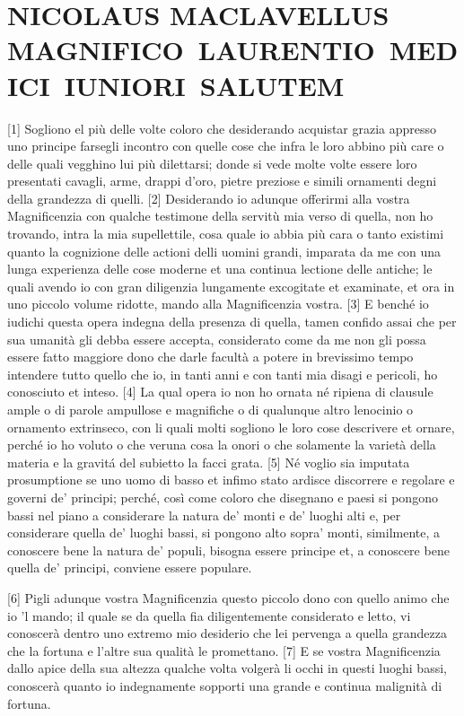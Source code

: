 
\section*{NICOLAUS MACLAVELLUS MAGNIFICO~LAURENTIO~MEDICI~IUNIORI~SALUTEM}

{[}1{]} Sogliono el più delle volte coloro che desiderando acquistar
grazia appresso uno principe farsegli incontro con quelle cose che infra
le loro abbino più care o delle quali vegghino lui più dilettarsi; donde
si vede molte volte essere loro presentati cavagli, arme, drappi d'oro,
pietre preziose e simili ornamenti degni della grandezza di quelli.
{[}2{]} Desiderando io adunque offerirmi alla vostra Magnificenzia con
qualche testimone della servitù mia verso di quella, non ho trovando,
intra la mia supellettile, cosa quale io abbia più cara o tanto existimi
quanto la cognizione delle actioni delli uomini grandi, imparata da me
con una lunga experienza delle cose moderne et una continua lectione
delle antiche; le quali avendo io con gran diligenzia lungamente
excogitate et examinate, et ora in uno piccolo volume ridotte, mando
alla Magnificenzia vostra. {[}3{]} E benché io iudichi questa opera
indegna della presenza di quella, tamen confido assai che per sua
umanità gli debba essere accepta, considerato come da me non gli possa
essere fatto maggiore dono che darle facultà a potere in brevissimo
tempo intendere tutto quello che io, in tanti anni e con tanti mia
disagi e pericoli, ho conosciuto et inteso. {[}4{]} La qual opera io non
ho ornata né ripiena di clausule ample o di parole ampullose e
magnifiche o di qualunque altro lenocinio o ornamento extrinseco, con li
quali molti sogliono le loro cose descrivere et ornare, perché io ho
voluto o che veruna cosa la onori o che solamente la varietà della
materia e la gravitá del subietto la facci grata. {[}5{]} Né voglio sia
imputata prosumptione se uno uomo di basso et infimo stato ardisce
discorrere e regolare e governi de' principi; perché, così come coloro
che disegnano e paesi si pongono bassi nel piano a considerare la natura
de' monti e de' luoghi alti e, per considerare quella de' luoghi bassi,
si pongono alto sopra' monti, similmente, a conoscere bene la natura de'
populi, bisogna essere principe et, a conoscere bene quella de'
principi, conviene essere populare.

{[}6{]} Pigli adunque vostra Magnificenzia questo piccolo dono con
quello animo che io 'l mando; il quale se da quella fia diligentemente
considerato e letto, vi conoscerà dentro uno extremo mio desiderio che
lei pervenga a quella grandezza che la fortuna e l'altre sua qualità le
promettano. {[}7{]} E se vostra Magnificenzia dallo apice della sua
altezza qualche volta volgerà li occhi in questi luoghi bassi, conoscerà
quanto io indegnamente sopporti una grande e continua malignità di
fortuna.

